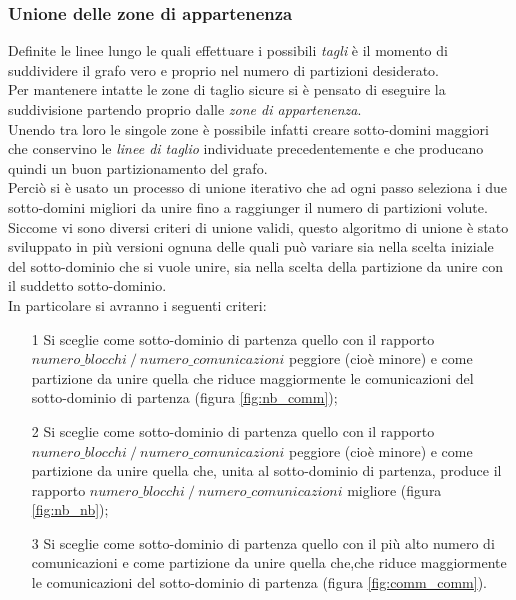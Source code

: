 {\subsubsection{Unione delle zone di appartenenza}\label{subsubsec:varius_merge}
Definite le linee lungo le quali effettuare i possibili \textit{tagli} è il momento di suddividere il grafo vero e proprio nel numero di partizioni desiderato.\\
Per mantenere intatte le zone di taglio sicure si è pensato di eseguire la suddivisione partendo proprio dalle \textit{zone di appartenenza}.\\
Unendo tra loro le singole zone è possibile infatti creare sotto-domini maggiori che conservino le \textit{linee di taglio} individuate precedentemente e che producano quindi un buon partizionamento del grafo.\\
Perciò si è usato un processo di unione iterativo che ad ogni passo seleziona i due sotto-domini migliori da unire fino a raggiunger il numero di partizioni volute.\\
Siccome vi sono diversi criteri di unione validi, questo algoritmo di unione è stato sviluppato in più versioni ognuna delle quali può variare sia nella scelta iniziale del sotto-dominio che si vuole unire, sia nella scelta della partizione da unire con il suddetto sotto-dominio.\\
In particolare si avranno i seguenti criteri:
\begin{itemize}
	\item[1] Si sceglie come sotto-dominio di partenza quello con il rapporto\\
	$numero\_blocchi\mathbin{/}numero\_comunicazioni$ peggiore (cioè minore) e come partizione da unire quella che riduce maggiormente le comunicazioni del sotto-dominio di partenza (figura \ref{fig:nb_comm});
	\item[2] Si sceglie come sotto-dominio di partenza quello con il rapporto\\
	$numero\_blocchi\mathbin{/}numero\_comunicazioni$ peggiore (cioè minore) e come partizione da unire quella che, unita al sotto-dominio di partenza, produce il rapporto $numero\_blocchi\mathbin{/}numero\_comunicazioni$ migliore (figura \ref{fig:nb_nb});
	\item[3] Si sceglie come sotto-dominio di partenza quello con il più alto numero di comunicazioni e come partizione da unire quella che,che riduce maggiormente le comunicazioni del sotto-dominio di partenza (figura \ref{fig:comm_comm}).
\end{itemize}
}
